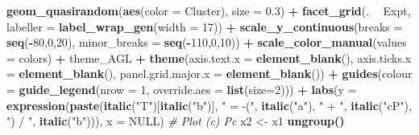 \documentclass[
]{article}
\newenvironment{Shaded}{\begin{snugshade}}{\end{snugshade}}
\newcommand{\CommentTok}[1]{\textcolor[rgb]{0.56,0.35,0.01}{\textit{#1}}}
\newcommand{\DataTypeTok}[1]{\textcolor[rgb]{0.13,0.29,0.53}{#1}}
\newcommand{\DecValTok}[1]{\textcolor[rgb]{0.00,0.00,0.81}{#1}}
\newcommand{\FloatTok}[1]{\textcolor[rgb]{0.00,0.00,0.81}{#1}}
\newcommand{\KeywordTok}[1]{\textcolor[rgb]{0.13,0.29,0.53}{\textbf{#1}}}
\newcommand{\NormalTok}[1]{#1}
\newcommand{\OperatorTok}[1]{\textcolor[rgb]{0.81,0.36,0.00}{\textbf{#1}}}
\newcommand{\OtherTok}[1]{\textcolor[rgb]{0.56,0.35,0.01}{#1}}
\newcommand{\StringTok}[1]{\textcolor[rgb]{0.31,0.60,0.02}{#1}}
\begin{document}
\begin{Shaded}
\begin{Highlighting}[]
{{{{{{{{{{{{\StringTok{  }\KeywordTok{geom_quasirandom}\NormalTok{(}\KeywordTok{aes}\NormalTok{(}\DataTypeTok{color =}\NormalTok{ Cluster), }\DataTypeTok{size =} \FloatTok{0.3}\NormalTok{) }\OperatorTok{+}\StringTok{ }
\StringTok{  }\KeywordTok{facet_grid}\NormalTok{(. }\OperatorTok{~}\StringTok{ }\NormalTok{Expt, }\DataTypeTok{labeller =} \KeywordTok{label_wrap_gen}\NormalTok{(}\DataTypeTok{width =} \DecValTok{17}\NormalTok{)) }\OperatorTok{+}
\StringTok{  }\KeywordTok{scale_y_continuous}\NormalTok{(}\DataTypeTok{breaks =} \KeywordTok{seq}\NormalTok{(}\OperatorTok{-}\DecValTok{80}\NormalTok{,}\DecValTok{0}\NormalTok{,}\DecValTok{20}\NormalTok{), }\DataTypeTok{minor_breaks =} \KeywordTok{seq}\NormalTok{(}\OperatorTok{-}\DecValTok{110}\NormalTok{,}\DecValTok{0}\NormalTok{,}\DecValTok{10}\NormalTok{)) }\OperatorTok{+}
\StringTok{  }\KeywordTok{scale_color_manual}\NormalTok{(}\DataTypeTok{values =}\NormalTok{ colors) }\OperatorTok{+}
\StringTok{  }\NormalTok{theme_AGL }\OperatorTok{+}
\StringTok{  }\KeywordTok{theme}\NormalTok{(}\DataTypeTok{axis.text.x  =} \KeywordTok{element_blank}\NormalTok{(), }
        \DataTypeTok{axis.ticks.x =} \KeywordTok{element_blank}\NormalTok{(),}
        \DataTypeTok{panel.grid.major.x =} \KeywordTok{element_blank}\NormalTok{()) }\OperatorTok{+}
\StringTok{  }\KeywordTok{guides}\NormalTok{(}\DataTypeTok{colour =} \KeywordTok{guide_legend}\NormalTok{(}\DataTypeTok{nrow =} \DecValTok{1}\NormalTok{, }\DataTypeTok{override.aes =} \KeywordTok{list}\NormalTok{(}\DataTypeTok{size=}\DecValTok{2}\NormalTok{))) }\OperatorTok{+}
\StringTok{  }\KeywordTok{labs}\NormalTok{(}\DataTypeTok{y =} \KeywordTok{expression}\NormalTok{(}\KeywordTok{paste}\NormalTok{(}\KeywordTok{italic}\NormalTok{(}\StringTok{"T"}\NormalTok{)[}\KeywordTok{italic}\NormalTok{(}\StringTok{"b"}\NormalTok{)], }\StringTok{" = -("}\NormalTok{, }\KeywordTok{italic}\NormalTok{(}\StringTok{"a"}\NormalTok{), }\StringTok{" + "}\NormalTok{,}
              \KeywordTok{italic}\NormalTok{(}\StringTok{"cP"}\NormalTok{), }\StringTok{") / "}\NormalTok{, }\KeywordTok{italic}\NormalTok{(}\StringTok{"b"}\NormalTok{))), }\DataTypeTok{x =} \OtherTok{NULL}\NormalTok{)}
\CommentTok{# Plot (c) Pc}
\NormalTok{x2 <-}\StringTok{ }\NormalTok{x1 }\OperatorTok{%
\StringTok{  }\KeywordTok{ungroup}\NormalTok{() }\OperatorTok{%
}}}}}}}}}}}}}}
\end{Highlighting}
\end{Shaded}
\end{document}
